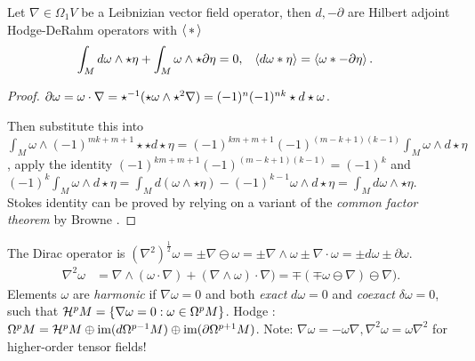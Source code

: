 \documentclass{juliacon}
\begin{document}
\begin{theorem}
	Let $ \nabla \in\Omega_1 V $ be a Leibnizian vector field operator, then $d,-\partial$ are Hilbert adjoint Hodge-DeRahm operators with $\left\langle \,\ast\, \right\rangle$
	\begin{align*}
		\int_M d\omega\wedge\star\eta +\int_M \omega\wedge\star\partial\eta &= 0, & \left\langle d\omega\ast\eta \right\rangle &=\left\langle \omega\ast-\partial\eta \right\rangle.
	\end{align*}
\end{theorem}
\begin{proof}
	$\partial\omega = \omega\cdot\nabla = \star^{-1}(\star\omega\wedge\star^2\nabla) = (-1)^n(-1)^{nk}\star d\star\omega$.


	Then  substitute this into $\int_M \omega\wedge(-1)^{mk+m+1}\star\star d\star\eta = (-1)^{km+m+1}(-1)^{(m-k+1)(k-1)}\int_M\omega\wedge d\star\eta$,
	apply the identity $(-1)^{km+m+1}(-1)^{(m-k+1)(k-1)}=(-1)^k$ and
	$ (-1)^k\int_M\omega\wedge d\star\eta = \int_M d(\omega\wedge\star\eta) - (-1)^{k-1}\omega\wedge d\star\eta = \int_M d\omega\wedge\star\eta$.
	Stokes identity can be proved by relying on a variant of the \textit{common factor theorem} by Browne \cite{browne}.
\end{proof}
\begin{theorem}
	The Dirac operator \cite{garling} is $ (\nabla^2)^\frac12\omega = \pm\nabla\ominus\omega = \pm\nabla\wedge\omega \pm \nabla\cdot\omega  = \pm d\omega\pm\partial\omega$.
	\begin{align*}
		\nabla^2\omega &= \nabla\wedge(\omega\cdot\nabla) + (\nabla\wedge\omega)\cdot\nabla) = \mp(\mp\omega\ominus\nabla)\ominus\nabla).
	\end{align*}
	Elements $\omega$ are \textit{harmonic} if $\nabla\omega = 0$ and both \textit{exact} $d\omega=0$ and \textit{coexact} $\delta\omega=0$, such that $\mathcal{H}^p M = \left\{ \nabla\omega = 0 : \omega\in \Omega^pM \right\}$.
	Hodge \cite{ivancevic}:
	$\Omega^pM=\mathcal{H}^pM\oplus\text{im}(d\Omega^{p-1}M)\oplus\text{im}(\partial\Omega^{p+1}M)$.
	Note: $\nabla\omega=-\omega\nabla, \nabla^2\omega=\omega\nabla^2$ for higher-order tensor fields!
\end{theorem}

\end{document}
